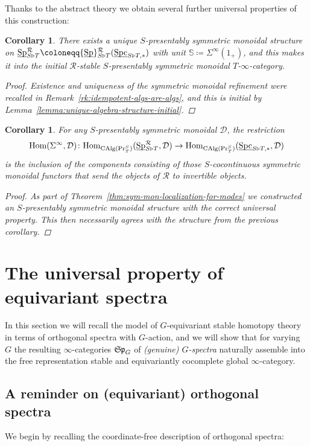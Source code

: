 \documentclass[reqno]{memo-l}
\theoremstyle{mythm}
\newtheorem{cor}[thm]{Corollary}
\theoremstyle{definition}
\numberwithin{equation}{section}
\newcommand{\Dd}{{\mathcal{D}}}
\newcommand{\Rr}{{\mathcal R}}
\DeclareMathOperator{\Sp}{Sp}
\DeclareMathOperator{\Spc}{Spc}
\renewcommand{\hom}{\textup{hom}}
\renewcommand{\hom}{{\textup{Hom}}}
\DeclareMathOperator{\CAlg}{\textup{CAlg}}
\renewcommand{\Pr}{\textup{Pr}}
\newcommand{\ulhelper}[2]{\underline{\setbox0=\hbox{$#1#2$}\dp0=0.4pt \box0\relax}}
\newcommand{\ul}[1]{{\mathpalette\ulhelper{#1}}\hbox{\rule[-2pt]{0pt}{0pt}}}
\newcommand{\mySp}{{\mathfrak S\kern-.5pt\mathfrak p}}
\begin{document}
Thanks to the abstract theory we obtain several further universal properties of this construction:

\begin{cor}\label{cor:SpR-initial}
    There exists a unique $S$-presentably symmetric monoidal structure on $\ul\Sp_{S\triangleright T}^\Rr\coloneqq\ul\Sp_{S\triangleright T}^\Rr(\ul\Spc_{S\triangleright T,*})$ with unit $\mathbb S\coloneqq\Sigma^\infty(1_+)$, and this makes it into the initial $\Rr$-stable $S$-presentably symmetric monoidal $T$-$\infty$-category. 
    \begin{proof}
        Existence and uniqueness of the symmetric monoidal refinement were recalled in Remark~\ref{rk:idempotent-algs-are-algs}, and this is initial by Lemma~\ref{lemma:unique-algebra-structure-initial}.
    \end{proof}
\end{cor}

\begin{cor}\label{cor:SpR-sym-mon-univ-prop}
    For any $S$-presentably symmetric monoidal $\Dd$, the restriction
    \[
        \hom(\Sigma^\infty,\Dd)\colon \hom_{\CAlg(\Pr^S_T)}(\ul\Sp_{S\triangleright T}^\Rr,\Dd)\to \hom_{\CAlg(\Pr^S_T)}(\ul\Spc_{S\triangleright T,*},\Dd)
    \]
    is the inclusion of the components consisting of those $S$-cocontinuous symmetric monoidal functors that send the objects of $\Rr$ to invertible objects.
    \begin{proof}
        As part of Theorem~\ref{thm:sym-mon-localization-for-modes} we constructed an $S$-presentably symmetric monoidal structure with the correct universal property. This then necessarily agrees with the structure from the previous corollary.
    \end{proof}
\end{cor}

\section[The universal property of equivariant spectra]{The universal property of equivariant spectra}\label{sec:equiv-spectra}
In this section we will recall the model of $G$-equivariant stable homotopy theory in terms of orthogonal spectra with $G$-action, and we will show that for varying $G$ the resulting $\infty$-categories $\mySp_G$ of \emph{(genuine) $G$-spectra} naturally assemble into the free representation stable and equivariantly cocomplete global $\infty$-category.

\subsection{A reminder on (equivariant) orthogonal spectra}\label{subsec:equiv-spectra}
We begin by recalling the coordinate-free description of orthogonal spectra:
\end{document}
